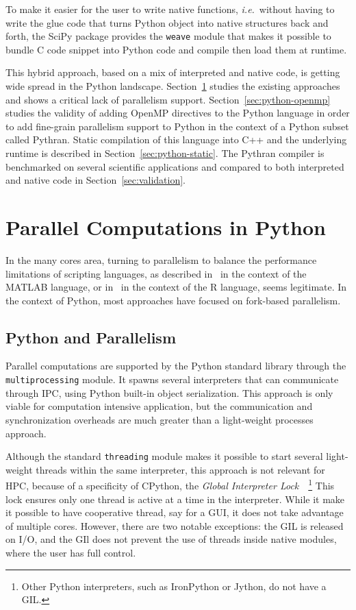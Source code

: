 \documentclass{llncs}
\begin{document}
To make it easier for the user to write native functions, \emph{i.e.}\ without
having to write the glue code that turns Python object into native structures
back and forth, the SciPy package provides the \texttt{weave} module that makes
it possible to bundle C code snippet into Python code and compile then load them
at runtime.

This hybrid approach, based on a mix of interpreted and native code, is getting
wide spread in the Python landscape. Section~\ref{sec:python-parallel} studies
the existing approaches and shows a critical lack of parallelism support.
Section~\ref{sec:python-openmp} studies the validity of adding OpenMP directives
to the Python language in order to add fine-grain parallelism support to Python
in the context of a Python subset called Pythran. Static compilation of this
language into C++ and the underlying runtime is described in
Section~\ref{sec:python-static}. The Pythran compiler is benchmarked on several
scientific applications and compared to both interpreted and native code in
Section~\ref{sec:validation}.

\section{Parallel Computations in Python}\label{sec:python-parallel}

In the many cores area, turning to parallelism to balance the performance
limitations of scripting languages, as described in~\cite{choy05} in the context
of the MATLAB language, or in~\cite{mals07} in the context of the R language,
seems legitimate. In the context of Python, most approaches have
focused on fork-based parallelism.

\subsection{Python and Parallelism}

Parallel computations are supported by the Python standard library through the
\texttt{multiprocessing} module. It spawns several interpreters that can
communicate through IPC, using Python built-in object serialization. This
approach is only viable for computation intensive application, but the
communication and synchronization overheads are much greater than a light-weight
processes approach.

Although the standard \texttt{threading} module makes it possible to start
several light-weight threads within the same interpreter, this approach is not
relevant for HPC, because of a specificity of CPython, the \emph{Global
Interpreter Lock}~\cite{gil2012}~\footnote{Other Python interpreters, such as
IronPython or Jython, do not have a GIL.} This lock ensures only one thread is
active at a time in the interpreter. While it make it possible to have
cooperative thread, say for a GUI, it does not take advantage of multiple cores.
However, there are two notable exceptions: the GIL is released on I/O, and the
GIl does not prevent the use of threads inside native modules, where the user
has full control.
\end{document}
